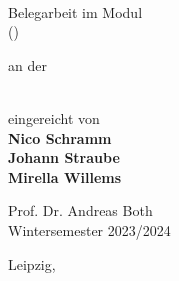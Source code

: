 
\begin{titlepage}

    \begin{figure}[!tbp]
        \centering
    \end{figure}

    \begin{center} \large

        \vspace*{1.5cm}
        
        \begin{minipage}{0.6\textwidth}
            \centering
            {\Huge \textbf{
                \papertitle\\
            }}
        \end{minipage}

        \vspace*{1.5cm}

        Belegarbeit im Modul\\
        \emph{\module} (\modulenumber)

        \vspace*{0.5cm}

        an der\\
        \universityname\\
        \facultyname

        \vspace*{1.5cm}
        
        eingereicht von \\
        \vspace*{0.2cm}
        {\Large \textbf{
            Nico Schramm\\
            Johann Straube\\
            Mirella Willems\\
        }}
          
        \vfill

        Prof. Dr. Andreas Both \\
        Wintersemester 2023/2024

        \vspace*{1cm}

        Leipzig, \dateofsubmission
    \end{center}

\end{titlepage}
